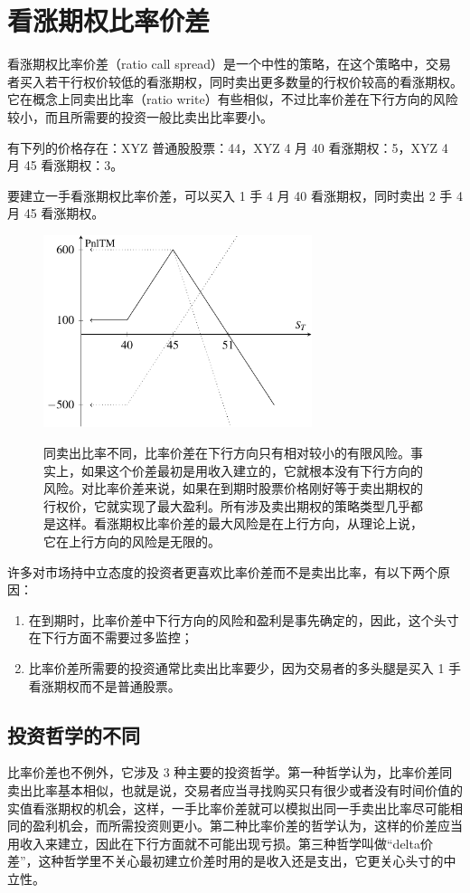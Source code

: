 \chapter{看涨期权比率价差\label{CH:ratio call spreads}}
看涨期权比率价差（ratio call spread）是一个中性的策略，在这个策略中，交易者买入若干行权价较低的看涨期权，同时卖出更多数量的行权价较高的看涨期权。它在概念上同卖出比率（ratio write）有些相似，不过比率价差在下行方向的风险较小，而且所需要的投资一般比卖出比率要小。

有下列的价格存在：XYZ 普通股股票：44，XYZ 4 月 40 看涨期权：5，XYZ 4 月 45 看涨期权：3。

要建立一手看涨期权比率价差，可以买入 1 手 4 月 40 看涨期权，同时卖出 2 手 4 月 45 看涨期权。

\begin{figure}
    \centering
    \includegraphics[width=0.7\textwidth]{IMG/Ratio call spread 2to1.pdf}
    \label{fig:Ratio call spread}
    \caption{同卖出比率不同，比率价差在下行方向只有相对较小的有限风险。事实上，如果这个价差最初是用收入建立的，它就根本没有下行方向的风险。对比率价差来说，如果在到期时股票价格刚好等于卖出期权的行权价，它就实现了最大盈利。所有涉及卖出期权的策略类型几乎都是这样。看涨期权比率价差的最大风险是在上行方向，从理论上说，它在上行方向的风险是无限的。}
\end{figure}

许多对市场持中立态度的投资者更喜欢比率价差而不是卖出比率，有以下两个原因：
\begin{enumerate}
    \item 在到期时，比率价差中下行方向的风险和盈利是事先确定的，因此，这个头寸在下行方面不需要过多监控；
    \item 比率价差所需要的投资通常比卖出比率要少，因为交易者的多头腿是买入 1 手看涨期权而不是普通股票。
\end{enumerate}
\section{投资哲学的不同}
比率价差也不例外，它涉及 3 种主要的投资哲学。第一种哲学认为，比率价差同卖出比率基本相似，也就是说，交易者应当寻找购买只有很少或者没有时间价值的实值看涨期权的机会，这样，一手比率价差就可以模拟出同一手卖出比率尽可能相同的盈利机会，而所需投资则更小。第二种比率价差的哲学认为，这样的价差应当用收入来建立，因此在下行方面就不可能出现亏损。第三种哲学叫做“delta价差”，这种哲学里不关心最初建立价差时用的是收入还是支出，它更关心头寸的中立性。
